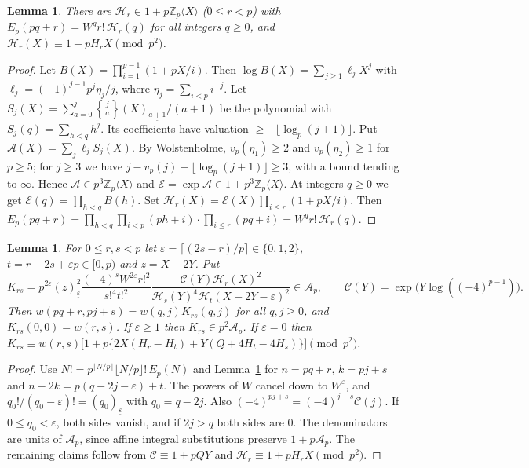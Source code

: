 \documentclass[11pt]{amsart}
\newtheorem{lemma}[theorem]{Lemma}
\theoremstyle{definition}
\theoremstyle{remark}
\newcommand{\Zp}{\mathbb{Z}_p}
\begin{document}
\begin{lemma}\label{lem:unitfactorial}
There are $\mathcal H_r\in1+p\Zp\langle X\rangle$ ($0\le r<p$) with
$E_p(pq+r)=W^qr!\,\mathcal H_r(q)$ for all integers $q\ge0$, and
$\mathcal H_r(X)\equiv1+pH_rX\pmod{p^2}$.
\end{lemma}
\begin{proof}
Let $B(X)=\prod_{i=1}^{p-1}(1+pX/i)$. Then $\log B(X)=\sum_{j\ge1}\ell_jX^j$ with
$\ell_j=(-1)^{j-1}p^j\eta_j/j$, where $\eta_j=\sum_{i<p}i^{-j}$. Let
$S_j(X)=\sum_{a=0}^j\genfrac\{\}{0pt}{}{j}{a}(X)_{\underline{a+1}}/(a+1)$ be the polynomial with
$S_j(q)=\sum_{h<q}h^j$. Its coefficients have valuation $\ge-\lfloor\log_p(j+1)\rfloor$. Put
$\mathcal A(X)=\sum_j\ell_jS_j(X)$. By Wolstenholme, $v_p(\eta_1)\ge2$ and $v_p(\eta_2)\ge1$
for $p\ge5$; for $j\ge3$ we have $j-v_p(j)-\lfloor\log_p(j+1)\rfloor\ge3$, with a bound tending
to $\infty$. Hence $\mathcal A\in p^3\Zp\langle X\rangle$ and
$\mathcal E=\exp\mathcal A\in1+p^3\Zp\langle X\rangle$. At integers $q\ge0$ we get
$\mathcal E(q)=\prod_{h<q}B(h)$. Set $\mathcal H_r(X)=\mathcal E(X)\prod_{i\le r}(1+pX/i)$. Then
$E_p(pq+r)=\prod_{h<q}\prod_{i<p}(ph+i)\cdot\prod_{i\le r}(pq+i)=W^qr!\,\mathcal H_r(q)$.
\end{proof}

\begin{lemma}\label{lem:kernel}
For $0\le r,s<p$ let $\varepsilon=\lceil(2s-r)/p\rceil\in\{0,1,2\}$, $t=r-2s+\varepsilon p\in[0,p)$
and $z=X-2Y$. Put
\[
 K_{rs}=p^{2\varepsilon}(z)_{\underline\varepsilon}^2\frac{(-4)^sW^{2\varepsilon}r!^2}{s!^4t!^2}
 \frac{\mathcal C(Y)\mathcal H_r(X)^2}{\mathcal H_s(Y)^4\mathcal H_t(X-2Y-\varepsilon)^2}\in\mathcal A_p,
 \qquad \mathcal C(Y)=\exp\bigl(Y\log((-4)^{p-1})\bigr).
\]
Then $w(pq+r,pj+s)=w(q,j)K_{rs}(q,j)$ for all $q,j\ge0$, and $K_{rs}(0,0)=w(r,s)$. If
$\varepsilon\ge1$ then $K_{rs}\in p^2\mathcal A_p$. If $\varepsilon=0$ then
$K_{rs}\equiv w(r,s)\bigl[1+p\{2X(H_r-H_t)+Y(Q+4H_t-4H_s)\}\bigr]\pmod{p^2}$.
\end{lemma}
\begin{proof}
Use $N!=p^{\lfloor N/p\rfloor}\lfloor N/p\rfloor!\,E_p(N)$ and Lemma~\ref{lem:unitfactorial} for
$n=pq+r$, $k=pj+s$ and $n-2k=p(q-2j-\varepsilon)+t$. The powers of $W$ cancel down to
$W^\varepsilon$, and $q_0!/(q_0-\varepsilon)!=(q_0)_{\underline\varepsilon}$ with $q_0=q-2j$. Also
$(-4)^{pj+s}=(-4)^{j+s}\mathcal C(j)$. If $0\le q_0<\varepsilon$, both sides vanish, and if $2j>q$ both
sides are $0$. The denominators are units of $\mathcal A_p$, since affine integral substitutions
preserve $1+p\mathcal A_p$. The remaining claims follow from
$\mathcal C\equiv1+pQY$ and $\mathcal H_r\equiv1+pH_rX\pmod{p^2}$.
\end{proof}
\end{document}
